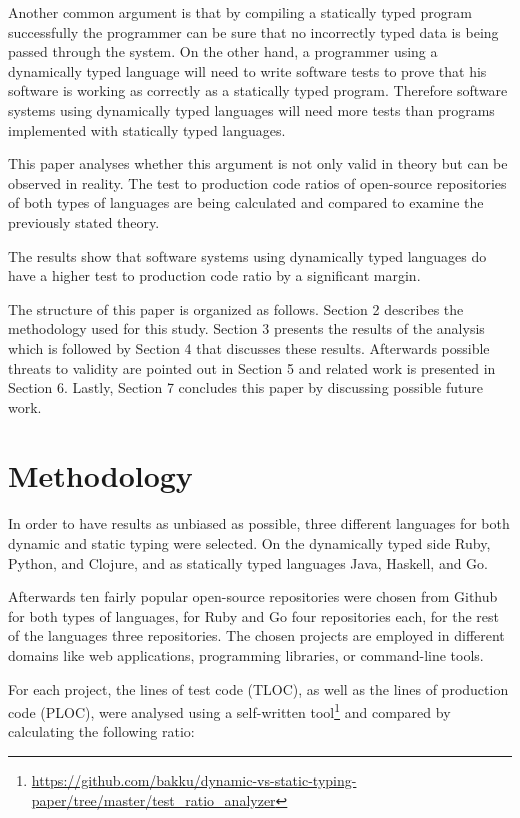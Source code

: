 \documentclass[conference]{IEEEtran}
\begin{document}
Another common argument is that by compiling a statically typed program successfully the programmer can be sure that no incorrectly typed data is being passed through the system. On the other hand, a programmer using a dynamically typed language will need to write software tests to prove that his software is working as correctly as a statically typed program. Therefore software systems using dynamically typed languages will need more tests than programs implemented with statically typed languages.\cite{cardelli_luca_type_systems}

This paper analyses whether this argument is not only valid in theory but can be observed in reality. The test to production code ratios of open-source repositories of both types of languages are being calculated and compared to examine the previously stated theory.

The results show that software systems using dynamically typed languages do have a higher test to production code ratio by a significant margin.

The structure of this paper is organized as follows. Section 2 describes the methodology used for this study. Section 3 presents the results of the analysis which is followed by Section 4 that discusses these results. Afterwards possible threats to validity are pointed out in Section 5 and related work is presented in Section 6. Lastly, Section 7 concludes this paper by discussing possible future work.

\section{Methodology}

In order to have results as unbiased as possible, three different languages for both dynamic and static typing were selected. On the dynamically typed side Ruby, Python, and Clojure, and as statically typed languages Java, Haskell, and Go.

Afterwards ten fairly popular open-source repositories were chosen from Github for both types of languages, for Ruby and Go four repositories each, for the rest of the languages three repositories. The chosen projects are employed in different domains like web applications, programming libraries, or command-line tools.

For each project, the lines of test code (TLOC), as well as the lines of production code (PLOC), were analysed using a self-written tool\footnote{\url{https://github.com/bakku/dynamic-vs-static-typing-paper/tree/master/test\_ratio\_analyzer}} and compared by calculating the following ratio:
\end{document}
